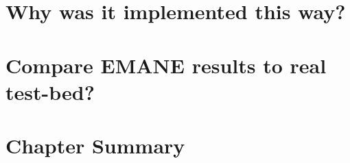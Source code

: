 


\section{Why was it implemented this way?}


\section{Compare EMANE results to real test-bed?}

\section {Chapter Summary}

